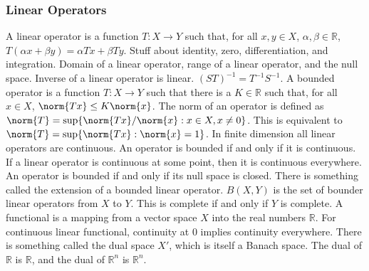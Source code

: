 \documentclass[crop=false,class=article,oneside]{standalone}
\begin{document}
        \subsubsection{Linear Operators}
            A linear operator is a function
            $T:X\rightarrow{Y}$ such that, for all
            $x,y\in{X}$, $\alpha,\beta\in\mathbb{R}$,
            $T(\alpha{x}+\beta{y})=\alpha{Tx}+\beta{Ty}$.
            Stuff about identity, zero, differentiation, and
            integration. 
            Domain of a linear operator, range of a linear operator,
            and the null space.
            Inverse of a linear operator is linear.
            $(ST)^{-1}=T^{-1}S^{-1}$.
            A bounded operator is a function $T:X\rightarrow{Y}$
            such that there is a $K\in\mathbb{R}$ such that, for all
            $x\in{X}$, $\norm{Tx}\leq{K}\norm{x}$. The norm of an operator
            is defined as
            $\norm{T}=\sup\{\norm{Tx}/\norm{x}:x\in{X},x\ne{0}\}$.
            This is equivalent to
            $\norm{T}=\sup\{\norm{Tx}:\norm{x}=1\}$. In finite dimension
            all linear operators are continuous. An operator is bounded
            if and only if it is continuous. If a linear operator is
            continuous at some point, then it is continuous everywhere.
            An operator is bounded if and only if its null space is closed.
            There is something called the extension of a bounded linear
            operator. $B(X,Y)$ is the set of bounder linear operators
            from $X$ to $Y$. This is complete if and only if
            $Y$ is complete. A functional is a mapping from a vector
            space $X$ into the real numbers $\mathbb{R}$. For continuous
            linear functional, continuity at $0$ implies continuity
            everywhere. There is something called the dual space
            $X'$, which is itself a Banach space. The dual
            of $\mathbb{R}$ is $\mathbb{R}$, and the dual of
            $\mathbb{R}^{n}$ is $\mathbb{R}^{n}$.
\end{document}
